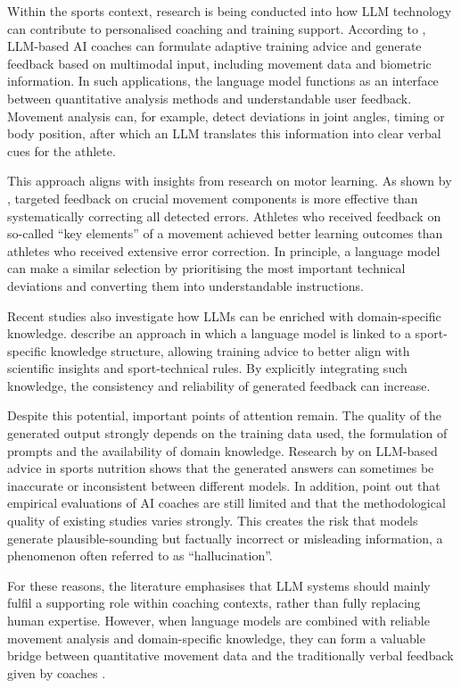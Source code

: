 Within the sports context, research is being conducted into how LLM technology can contribute to personalised coaching and training support. According to \textcite{Lai2025}, LLM-based AI coaches can formulate adaptive training advice and generate feedback based on multimodal input, including movement data and biometric information. In such applications, the language model functions as an interface between quantitative analysis methods and understandable user feedback. Movement analysis can, for example, detect deviations in joint angles, timing or body position, after which an LLM translates this information into clear verbal cues for the athlete.

This approach aligns with insights from research on motor learning. As shown by \textcite{Niznikowski2025}, targeted feedback on crucial movement components is more effective than systematically correcting all detected errors. Athletes who received feedback on so-called “key elements” of a movement achieved better learning outcomes than athletes who received extensive error correction. In principle, a language model can make a similar selection by prioritising the most important technical deviations and converting them into understandable instructions.

Recent studies also investigate how LLMs can be enriched with domain-specific knowledge. \textcite{He2026} describe an approach in which a language model is linked to a sport-specific knowledge structure, allowing training advice to better align with scientific insights and sport-technical rules. By explicitly integrating such knowledge, the consistency and reliability of generated feedback can increase.

Despite this potential, important points of attention remain. The quality of the generated output strongly depends on the training data used, the formulation of prompts and the availability of domain knowledge. Research by \textcite{Solomon2025} on LLM-based advice in sports nutrition shows that the generated answers can sometimes be inaccurate or inconsistent between different models. In addition, \textcite{Lai2025} point out that empirical evaluations of AI coaches are still limited and that the methodological quality of existing studies varies strongly. This creates the risk that models generate plausible-sounding but factually incorrect or misleading information, a phenomenon often referred to as “hallucination”.

For these reasons, the literature emphasises that LLM systems should mainly fulfil a supporting role within coaching contexts, rather than fully replacing human expertise. However, when language models are combined with reliable movement analysis and domain-specific knowledge, they can form a valuable bridge between quantitative movement data and the traditionally verbal feedback given by coaches \autocite{Jeraj2015}.

